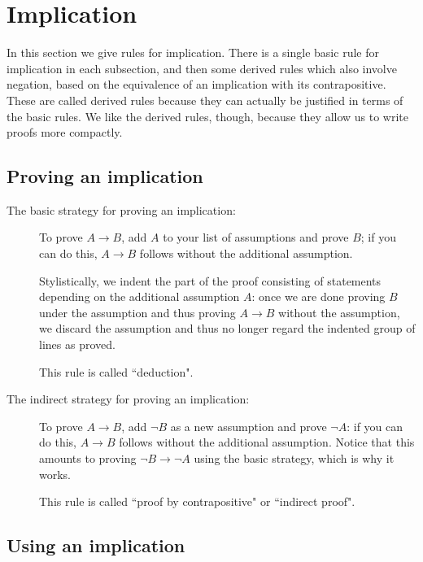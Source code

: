 \documentclass[12pt]{book}
\begin{document}
\section{Implication}

In this section we give rules for implication.  There is a single basic rule for implication in each subsection, and then some derived rules which also involve negation, based on the equivalence of an implication with its contrapositive.  These are called derived rules because they can actually be justified in terms of the basic rules.  We like the derived rules, though, because they allow us to write proofs more compactly.

\subsection{Proving an implication}

\begin{description}

\item[The basic strategy for proving an implication:]  To prove $A \rightarrow B$, add $A$ to your list of assumptions and prove $B$; if you can do this, $A \rightarrow B$ follows without the additional assumption.

Stylistically, we indent the part of the proof consisting of statements depending on the additional assumption $A$:  once we are done proving $B$ under the assumption and thus proving $A \rightarrow B$ without the assumption, we discard the assumption and thus no longer regard the indented group of lines as proved.

This rule is called ``deduction".

\item[The indirect strategy for proving an implication:]  To prove $A \rightarrow B$, add $\neg B$ as a new assumption and prove $\neg A$:  if you can do this, $A \rightarrow B$ follows without the additional assumption.  Notice that this amounts to proving $\neg B \rightarrow \neg A$ using the basic strategy, which is why it works.

This rule is called ``proof by contrapositive" or ``indirect proof".

\end{description}

\subsection{Using an implication}
\end{document}
